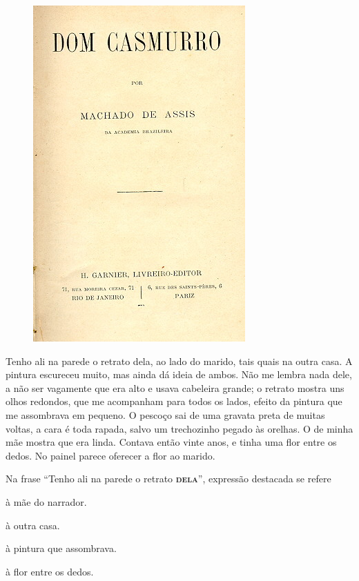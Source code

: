 \begin{myquote}

\begin{figure}[H]
\centering
\includegraphics[scale=0.25]{./imgSAEB_7_POR/media/image55.png}
\end{figure}

Tenho ali na parede o retrato dela, ao lado do marido, tais quais na outra
casa. A pintura escureceu muito, mas ainda dá ideia de ambos. Não me lembra
nada dele, a não ser vagamente que era alto e usava cabeleira grande; o
retrato mostra uns olhos redondos, que me acompanham para todos os lados,
efeito da pintura que me assombrava em pequeno. O pescoço sai de uma gravata
preta de muitas voltas, a cara é toda rapada, salvo um trechozinho pegado às
orelhas. O de minha mãe mostra que era linda. Contava então vinte anos, e
tinha uma flor entre os dedos. No painel parece oferecer a flor ao marido.


\end{myquote}

Na frase ``Tenho ali na parede o retrato \textsc{\textbf{dela}}'', expressão destacada
se refere

\begin{escolha}

  \item à mãe do narrador.
  
  \item à outra casa. 
  
  \item à pintura que assombrava.
  
  \item à flor entre os dedos.  

\end{escolha}


